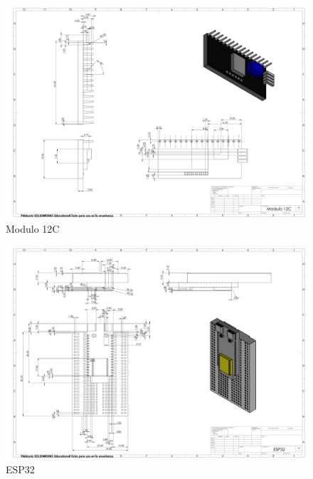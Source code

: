     \begin{figure}[H]
        \centering
       \includegraphics[trim = {10mm 10mm 10mm 10mm},clip,scale=0.120]{24/Img/modulo12C.pdf}
        \caption{Modulo 12C}
        \label{fig:Modulo 12C}
    \end{figure}
    \begin{figure}[H]
        \centering
        \includegraphics[trim = {10mm 10mm 10mm 10mm},clip,scale=0.120]{24/Img/ESP32.pdf}
        \caption{ESP32}
        \label{fig:ESP32}
    \end{figure}
